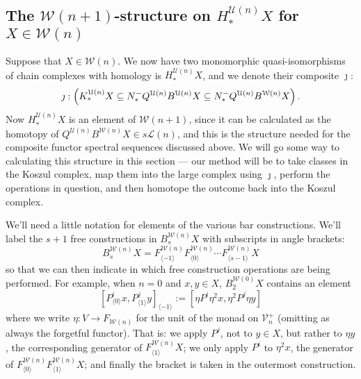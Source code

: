 \documentclass[11pt]{amsart}
\theoremstyle{plain}
\theoremstyle{definition}
\renewcommand{\to}{\longrightarrow}
\newcommand{\calW}{\mathcal{W}}
\newcommand{\calU}{\mathcal{U}}
\newcommand{\calL}{\mathcal{L}}
\newcommand{\calV}{\mathcal{V}}
\theoremstyle{plain}
\newcommand{\vect}[2]{\calV^{#1}_{#2}}
\newcommand{\Nop}{N^{\smash{-}}}
\begin{document}
\begin{Koszul complexes}
\subsection{The $\calW(n+1)$-structure on $H_*^{\calU(n)}X$ for $X\in\calW(n)$}\label{section on structure on homology of koszul cx}
Suppose that $X\in\calW(n)$. We now have two monomorphic quasi-isomorphisms of chain complexes with homology is $H_*^{\calU(n)}X$, and we denote their composite $\jmath$:
\[\jmath:\left(K_*^{\calU(n)}X\subseteq \Nop_*Q^{\calU(n)}B^{\calU(n)}X\subseteq \Nop_*Q^{\calU(n)}B^{\calW(n)}X\right).\]
Now $H^{\calU(n)}_*X$ is an element of $\calW(n+1)$, since it can be calculated as the homotopy of $Q^{\calU(n)}B^{\calW(n)}X\in s\calL(n)$, and this is the structure needed for the composite functor spectral sequences discussed above. We will go some way to calculating this structure in this section --- our method will be to take classes in the Koszul complex, map them into the large complex using $\jmath$, perform the operations in question, and then homotope the outcome back into the Koszul complex.

We'll need a little notation for elements of the various bar constructions. We'll label the $s+1$ free constructions in $B^{\calW(n)}_{s}X$ with subscripts in angle brackets: 
\[B^{\calW(n)}_{s}X= F^{\calW(n)}_{\langle -1\rangle}F^{\calW(n)}_{\langle 0\rangle}\cdots F^{\calW(n)}_{\langle s-1\rangle}X\]%
so that we can then indicate in which free construction operations are being performed. For example, when $n=0$ and $x,y\in X$, $B_2^{\calW(0)}X$ contains an element
\[[P^i_{\langle 0\rangle}x,P^j_{\langle 1\rangle}y]_{\langle -1\rangle}:=[\eta P^i\eta^2 x,\eta^2P^j\eta y]\]%
where we write $\eta:V\to F_{\calW(n)}$ for the unit of the monad on $\vect{+}{n}$ (omitting as always the forgetful functor). That is: we apply $P^j$, not to $y\in X$, but rather to $\eta y$, the corresponding generator of $F_{\langle 1\rangle}^{\calW(n)}X$; we only apply $P^i$ to $\eta^2 x$, the generator of $F^{\calW(n)}_{\langle 0\rangle}F^{\calW(n)}_{\langle 1\rangle}X$; and finally the bracket is taken in the outermost construction.%


\end{Koszul complexes}
\end{document}
